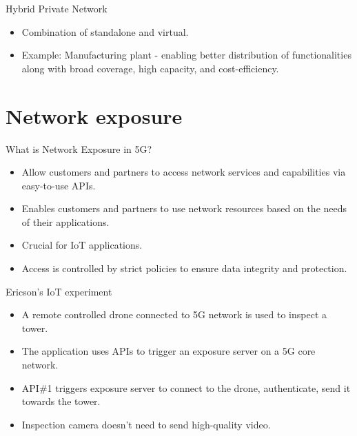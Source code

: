\documentclass{beamer}
\begin{document}
\begin{frame}{Hybrid Private Network}
  \vspace*{1.6em}
  \begin{itemize}
    \item Combination of standalone and virtual.
    \vspace*{0.75em}
    \item Example: Manufacturing plant - enabling better distribution of functionalities along with broad coverage, high capacity, and cost-efficiency.
  \end{itemize}
\end{frame}

\section[Network exposure]{Network exposure}


\begin{frame}{What is Network Exposure in 5G?}
  \vspace*{1.6em}
  \begin{itemize}
    \item Allow customers and partners to access network services and capabilities via  easy-to-use APIs.
    \item Enables customers and partners to use network resources based on the needs of their applications.
    \item Crucial for IoT applications.
    \item Access is controlled by strict policies to ensure data integrity and protection.
  \end{itemize}
\end{frame}


\begin{frame}{Ericson's IoT experiment}
  \vspace*{1.3em}
  \begin{itemize}
    \item A remote controlled drone connected to 5G network is used to inspect a tower.
    \item The application uses APIs to trigger an exposure server on a 5G core network.
    \item API\#1 triggers exposure server to connect to the drone, authenticate, send it towards the tower.
    \item Inspection camera doesn't need to send high-quality video. 
  \end{itemize}
\end{frame}
\end{document}
